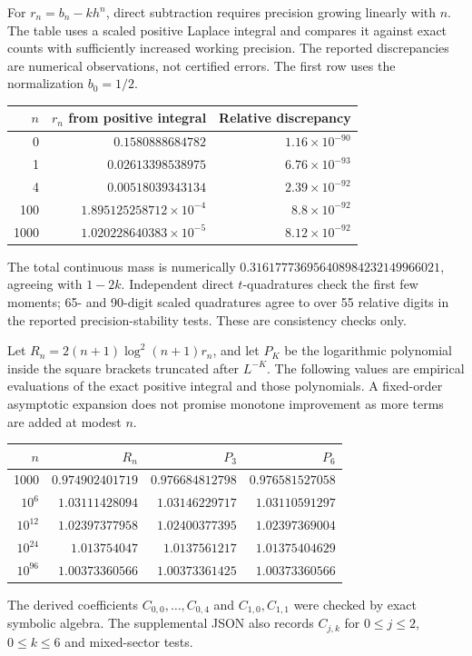 \documentclass[11pt,letterpaper]{article}
\theoremstyle{remark}\newtheorem{remark}[theorem]{Remark}
\begin{document}
For $r_n=b_n-kh^n$, direct subtraction requires precision growing linearly
with $n$. The table uses a scaled positive Laplace integral and compares it
against exact counts with sufficiently increased working precision. The
reported discrepancies are numerical observations, not certified errors.
The first row uses the normalization $b_0=1/2$.
\begin{center}
\begin{tabular}{rrr}
\toprule
$n$ & $r_n$ from positive integral & Relative discrepancy \\
\midrule
0 & $0.1580888684782$ & $1.16\times10^{-90}$ \\
1 & $0.02613398538975$ & $6.76\times10^{-93}$ \\
4 & $0.00518039343134$ & $2.39\times10^{-92}$ \\
100 & $1.895125258712\times10^{-4}$ & $8.8\times10^{-92}$ \\
1000 & $1.020228640383\times10^{-5}$ & $8.12\times10^{-92}$ \\
\bottomrule
\end{tabular}
\end{center}
The total continuous mass is numerically
$0.316177736956408984232149966021$, agreeing with $1-2k$.
Independent direct $t$-quadratures check the first few moments; 65- and
90-digit scaled quadratures agree to over 55 relative digits in the
reported precision-stability tests. These are consistency checks only.

Let $R_n=2(n+1)\log^2(n+1)r_n$, and let $P_K$ be the logarithmic polynomial
inside the square brackets truncated after $L^{-K}$. The following values
are empirical evaluations of the exact positive integral and those
polynomials. A fixed-order asymptotic expansion does not promise monotone
improvement as more terms are added at modest $n$.
\begin{center}
\begin{tabular}{rrrr}
\toprule
$n$ & $R_n$ & $P_3$ & $P_6$ \\
\midrule
1000 & $0.974902401719$ & $0.976684812798$ & $0.976581527058$ \\
$10^{6}$ & $1.03111428094$ & $1.03146229717$ & $1.03110591297$ \\
$10^{12}$ & $1.02397377958$ & $1.02400377395$ & $1.02397369004$ \\
$10^{24}$ & $1.013754047$ & $1.0137561217$ & $1.01375404629$ \\
$10^{96}$ & $1.00373360566$ & $1.00373361425$ & $1.00373360566$ \\
\bottomrule
\end{tabular}
\end{center}
The derived coefficients $C_{0,0},\ldots,C_{0,4}$ and $C_{1,0},C_{1,1}$
were checked by exact symbolic algebra. The supplemental JSON also records
$C_{j,k}$ for $0\le j\le2$, $0\le k\le6$ and mixed-sector tests.
\end{document}
